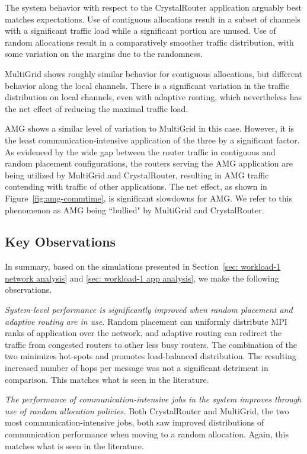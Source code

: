 The system behavior with respect to the CrystalRouter application arguably best
matches expectations. Use of contiguous allocations result in a subset of
channels with a significant traffic load while a significant portion are
unused. Use of random allocations result in a comparatively smoother traffic
distribution, with some variation on the margins due to the randomness.

MultiGrid shows roughly similar behavior for contiguous allocations, but
different behavior along the local channels. There is a significant variation in
the traffic distribution on local channels, even with adaptive routing, which
nevertheless has the net effect of reducing the maximal traffic load.

AMG shows a similar level of variation to MultiGrid in this case. However, it
is the least communication-intensive application of the three by a significant
factor. As evidenced by the wide gap between the router traffic in contiguous
and random placement configurations, the routers serving the AMG application
are being utilized by MultiGrid and CrystalRouter, resulting in AMG traffic
contending with traffic of other applications. The net effect, as shown in
Figure~\ref{fig:amg-commtime}, is significant slowdowns for AMG.
We refer to this phenomenon as AMG being ``bullied" by MultiGrid and CrystalRouter.

\subsection{Key Observations}
\label{sec:workload-1-observations}

In summary, based on the simulations presented in Section~\ref{sec: workload-1 network analysis} and \ref{sec: workload-1 app analysis}, we make the following observations.

\emph{System-level performance is significantly improved when random placement and adaptive routing are in use.} 
Random placement can uniformly distribute MPI ranks of application over the network, 
and adaptive routing can redirect the traffic from congested routers to other less busy routers. 
The combination of the two minimizes hot-spots and promotes load-balanced distribution. The resulting increased number of hops per message was not a significant detriment in comparison. This matches what is seen in the literature.

\emph{The performance of communication-intensive jobs in the system improves through use of random allocation policies.}
Both CrystalRouter and MultiGrid, the two most communication-intensive jobs,
both saw improved distributions of communication performance when moving to a
random allocation. Again, this matches what is seen in the literature.

